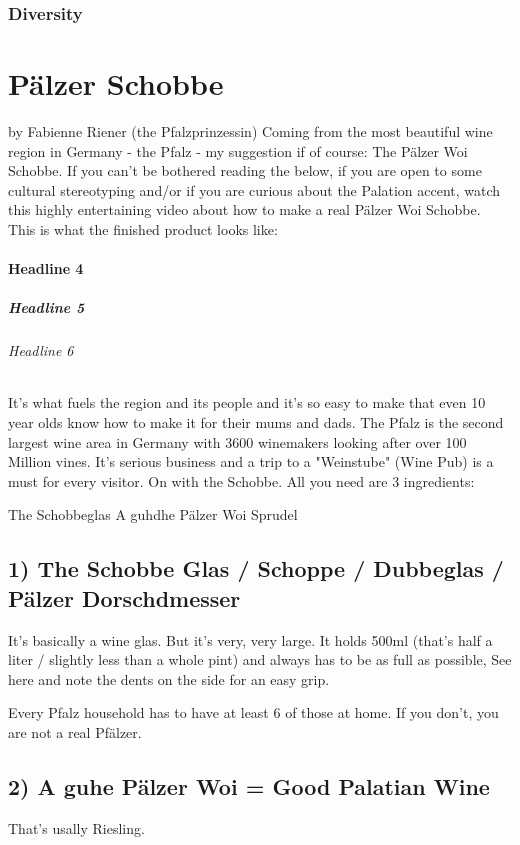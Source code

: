 \subsection{Diversity}
 
\chapter{Pälzer Schobbe}
by Fabienne Riener (the Pfalzprinzessin)
Coming from the most beautiful wine region in Germany - the Pfalz - my suggestion if of course: The Pälzer Woi Schobbe. 
If you can't be bothered reading the below, if you are open to some cultural stereotyping and/or if you are curious about the Palation accent, watch this highly entertaining video about how to make a real Pälzer Woi Schobbe.
This is what the finished product looks like:

\subsubsection{Headline 4}
\paragraph{Headline 5}
\subparagraph{Headline 6}
It's what fuels the region and its people and it's so easy to make that even 10 year olds know how to make it for their mums and dads. 
The Pfalz is the second largest wine area in Germany with 3600 winemakers looking after over 100 Million vines. It's serious business and a trip to a "Weinstube" (Wine Pub) is a must for every visitor. 
On with the Schobbe. All you need are 3 ingredients:

The Schobbeglas 
A guhdhe Pälzer Woi
Sprudel


\section{1) The Schobbe Glas / Schoppe / Dubbeglas / Pälzer Dorschdmesser}
It's basically a wine glas. But it's very, very large. It holds 500ml (that's half a liter / slightly less than a whole pint) and always has to be as full as possible,
See here and note the dents on the side for an easy grip.


Every Pfalz household has to have at least 6 of those at home. If you don't, you are not a real Pfälzer.

\section{2) A guhe Pälzer Woi = Good Palatian Wine}
That's usally Riesling.


